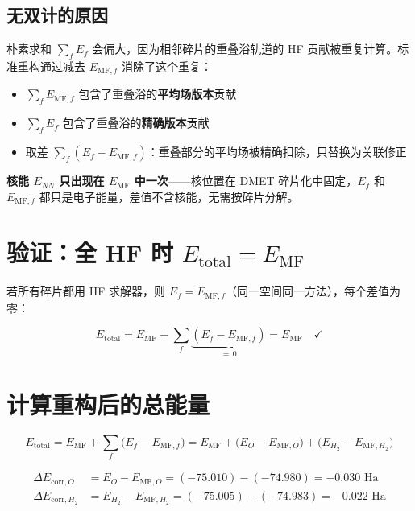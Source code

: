\documentclass[11pt,a4paper]{article}
\begin{document}
\subsection{无双计的原因}

朴素求和 $\sum_f E_f$ 会偏大，因为相邻碎片的重叠浴轨道的 HF 贡献被重复计算。标准重构通过减去 $E_{\text{MF},f}$ 消除了这个重复：

\begin{itemize}
  \item $\sum_f E_{\text{MF},f}$ 包含了重叠浴的\textbf{平均场版本}贡献
  \item $\sum_f E_f$ 包含了重叠浴的\textbf{精确版本}贡献
  \item 取差 $\sum_f (E_f - E_{\text{MF},f})$：重叠部分的平均场被精确扣除，只替换为关联修正
\end{itemize}

\textbf{核能 $E_{NN}$ 只出现在 $E_{\text{MF}}$ 中一次}——核位置在 DMET 碎片化中固定，$E_f$ 和 $E_{\text{MF},f}$ 都只是电子能量，差值不含核能，无需按碎片分解。


\section{验证：全 HF 时 $E_{\text{total}} = E_{\text{MF}}$}

若所有碎片都用 HF 求解器，则 $E_f = E_{\text{MF},f}$（同一空间同一方法），每个差值为零：

\begin{equation}
  E_{\text{total}} = E_{\text{MF}} + \sum_f \underbrace{(E_f - E_{\text{MF},f})}_{=\,0} = E_{\text{MF}} \quad \checkmark
\end{equation}

\section{计算重构后的总能量}

\begin{equation}
  E_{\text{total}} = E_{\text{MF}} + \sum_f \big(E_f - E_{\text{MF},f}\big) = E_{\text{MF}} + \big(E_O - E_{\text{MF},O}\big) + \big(E_{H_2} - E_{\text{MF},H_2}\big)
\end{equation}

\begin{align}
  \Delta E_{\text{corr},O} &= E_O - E_{\text{MF},O} = (-75.010) - (-74.980) = -0.030 \text{ Ha} \\
  \Delta E_{\text{corr},H_2} &= E_{H_2} - E_{\text{MF},H_2} = (-75.005) - (-74.983) = -0.022 \text{ Ha}
\end{align}
\end{document}
